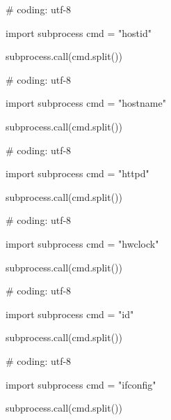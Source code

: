 \begin{mylisting}[label={lst:acpid},language=sh,caption=hostid]

# coding: utf-8

import subprocess
cmd = "hostid"

subprocess.call(cmd.split())

\end{mylisting}

\begin{mylisting}[label={lst:acpid},language=sh,caption=hostname]

# coding: utf-8

import subprocess
cmd = "hostname"

subprocess.call(cmd.split())

\end{mylisting}

\begin{mylisting}[label={lst:acpid},language=sh,caption=httpd]

# coding: utf-8

import subprocess
cmd = "httpd"

subprocess.call(cmd.split())

\end{mylisting}

\begin{mylisting}[label={lst:acpid},language=sh,caption=hwclock]

# coding: utf-8

import subprocess
cmd = "hwclock"

subprocess.call(cmd.split())

\end{mylisting}

\begin{mylisting}[label={lst:acpid},language=sh,caption=id]

# coding: utf-8

import subprocess
cmd = "id"

subprocess.call(cmd.split())

\end{mylisting}

\begin{mylisting}[label={lst:acpid},language=sh,caption=ifconfig]

# coding: utf-8

import subprocess
cmd = "ifconfig"

subprocess.call(cmd.split())

\end{mylisting}

